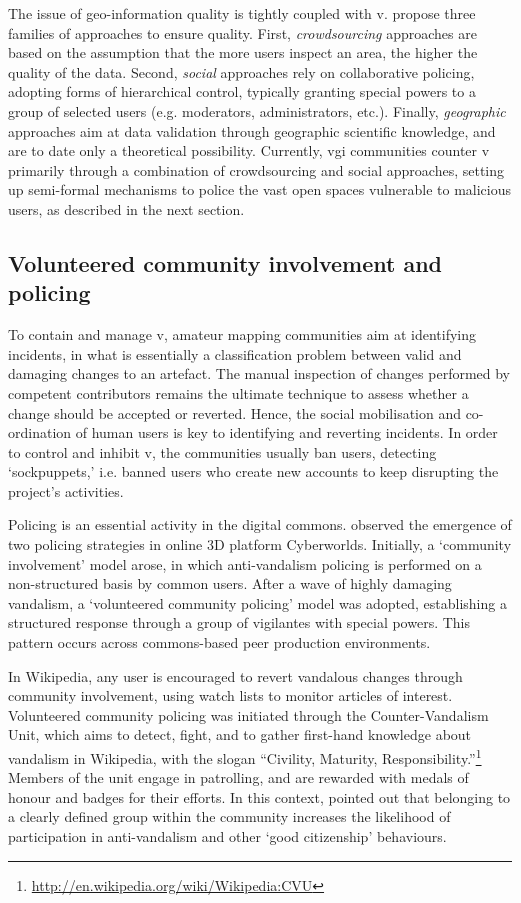 \documentclass{article} \usepackage{graphicx,xspace}
\newcommand{\footurl}[1]{\footnote{\url{#1}}}
\begin{document}
The issue of geo-information quality is tightly coupled with \gls{v}.
\cite{goodchild:2012:assuring} propose three families of approaches to ensure quality.
First, \emph{crowdsourcing} approaches are based on the assumption that the more users inspect an area, the higher the quality of the data.
Second, \emph{social} approaches rely on collaborative policing, adopting forms of hierarchical control, typically granting special powers to a group of selected users (e.g. moderators, administrators, etc.).
Finally, \emph{geographic} approaches aim at data validation through geographic scientific knowledge, and are to date only a theoretical possibility.
Currently, \gls{vgi} communities counter \gls{v} primarily through a combination of crowdsourcing and social approaches, setting up semi-formal mechanisms to police the vast open spaces vulnerable to malicious users, as described in the next section.




\subsection{Volunteered community involvement and policing}

To contain and manage \gls{v}, amateur mapping communities aim at identifying incidents, in what is essentially a classification problem between valid and damaging changes to an artefact.
The manual inspection of changes performed by competent contributors remains the ultimate technique to assess whether a change should be accepted or reverted.  
Hence, the social mobilisation and co-ordination of human users is key to identifying and reverting incidents.
In order to control and inhibit \gls{v}, the communities usually ban users, detecting `sockpuppets,' i.e. banned users who create new accounts to keep disrupting the project's activities.


Policing is an essential activity in the digital commons.
\cite{williams:2007:policing} observed the emergence of two policing strategies in online 3D platform Cyberworlds.
Initially, a `community involvement' model arose, in which anti-vandalism policing is performed on a non-structured basis by common users.
After a wave of highly damaging vandalism, a `volunteered community policing' model was adopted, establishing a structured response through a group of vigilantes with special powers.
This pattern occurs across commons-based peer production environments.

In Wikipedia, any user is encouraged to revert vandalous changes through community involvement, using watch lists to monitor articles of interest.
Volunteered community policing was initiated through the Counter-\-Vanda\-lism Unit, which aims to detect, fight, and to gather first-hand knowledge about vandalism in Wikipedia, with the slogan ``Civility, Maturity, Responsibility.''\footurl{http://en.wikipedia.org/wiki/Wikipedia:CVU} 
Members of the unit engage in patrolling, and are rewarded with medals of honour and badges for their efforts.
In this context, \cite{kittur:2009:herding} pointed out that belonging to a clearly defined group within the community increases the likelihood of participation in anti-vandalism and other `good citizenship' behaviours.
\end{document}
